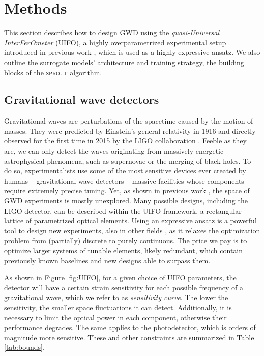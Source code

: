 \documentclass[a4paper,twocolumn,11pt,unpublished]{quantumarticle}
\newcommand{\algorithm}{\textsc{sprout}}
\begin{document}
\section{Methods}\label{sec:methods}
This section describes how to design GWD using the \textit{quasi-Universal InterFerOmeter} (UIFO), a highly overparametrized experimental setup introduced in previous work \cite{krenn2023uifo}, which is used as a highly expressive ansatz. We also outline the surrogate models' architecture and training strategy, the building blocks of the \algorithm\: algorithm.

\subsection{Gravitational wave detectors}\label{parametrizedGWD}

Gravitational waves are perturbations of the spacetime caused by the motion of masses. They were predicted by Einstein's general relativity in 1916 \cite{einstein1916naherungsweise} and directly observed for the first time in 2015 by the LIGO collaboration \cite{abbott2016observation}. Feeble as they are, we can only detect the waves originating from massively energetic astrophysical phenomena, such as supernovae or the merging of black holes. To do so, experimentalists use some of the most sensitive devices ever created by humans -- gravitational wave detectors -- massive facilities whose components require extremely precise tuning. Yet, as shown in previous work \cite{krenn2023uifo}, the space of GWD experiments is mostly unexplored. Many possible designs, including the LIGO detector, can be described within the UIFO framework, a rectangular lattice of parametrized optical elements. Using an expressive ansatz is a powerful tool to design new experiments, also in other fields \cite{sim2019expressibility, ruiz2023digital, rodriguez2024automated}, as it relaxes the optimization problem from (partially) discrete to purely continuous. The price we pay is to optimize larger systems of tunable elements, likely redundant, which contain previously known baselines and new designs able to surpass them.

As shown in Figure \ref{fig:UIFO}, for a given choice of UIFO parameters, the detector will have a certain strain sensitivity for each possible frequency of a gravitational wave, which we refer to as \textit{sensitivity curve}. The lower the sensitivity, the smaller space fluctuations it can detect. Additionally, it is necessary to limit the optical power in each component, otherwise their performance degrades. The same applies to the photodetector, which is orders of magnitude more sensitive. These and other constraints are summarized in Table \ref{tab:bounds}.
\end{document}
